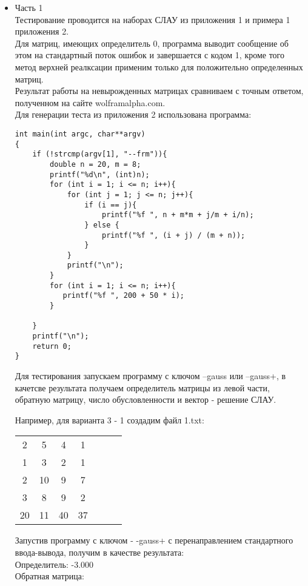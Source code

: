 \documentclass[a4paper,12pt,titlepage,finall]{article}
\begin{document}
\begin{itemize}
\item Часть 1\\
Тестирование проводится на наборах СЛАУ из приложения 1 и примера 1 приложения 2. \\
Для матриц, имеющих определитель 0, программа выводит сообщение об этом на стандартный поток ошибок и завершается с кодом 1, кроме того метод верхней реалксации применим только для положительно определенных матриц.\\
Результат работы на невырожденных матрицах сравниваем с точным ответом, полученном на сайте wolframalpha.com.\\
Для генерации теста из приложения 2 использована программа:
\begin{lstlisting}
int main(int argc, char**argv)
{
    if (!strcmp(argv[1], "--frm")){
        double n = 20, m = 8;
        printf("%d\n", (int)n);
        for (int i = 1; i <= n; i++){
            for (int j = 1; j <= n; j++){
                if (i == j){
                    printf("%f ", n + m*m + j/m + i/n);
                } else {
                    printf("%f ", (i + j) / (m + n));
                }
            }
            printf("\n");
        }
        for (int i = 1; i <= n; i++){
           printf("%f ", 200 + 50 * i);
        }

    }
    printf("\n");
    return 0;
}
\end{lstlisting}


Для тестирования запускаем программу с ключом --gauss или --gauss+, в качетсве результата получаем определитель матрицы из левой части, обратную матрицу, число обусловленности и вектор - решение СЛАУ.

Например, для варианта 3 - 1 создадим файл 1.txt:
\begin{tabular}{ccccccc}

2 & 5 & 4 & 1\\
1 & 3 & 2 & 1\\
2 & 10 & 9 & 7\\
3 & 8  & 9 & 2\\
20 & 11  & 40 & 37\\

\end{tabular}

Запустив программу с ключом - -gauss+ с перенаправлением стандартного ввода-вывода, получим в качестве результата:\\
Определитель: -3.000\\
Обратная матрица:
\begin{tabular}{ccccccc}


\end{tabular}
\end{itemize}
\end{document}
